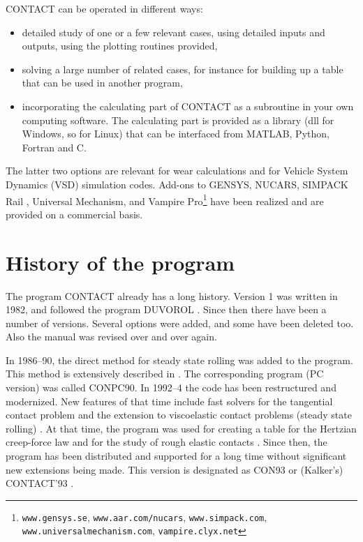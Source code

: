 \documentclass[12pt]{report}
\begin{document}
CONTACT can be operated in different ways:
\begin{itemize}
\item detailed study of one or a few relevant cases, using detailed inputs
        and outputs, using the plotting routines provided,
\item solving a large number of related cases, for instance for building up
        a table that can be used in another program,
\item incorporating the calculating part of CONTACT as a subroutine in your
        own computing software. The calculating part is provided as a
        library (dll for Windows, so for Linux) that can be interfaced from
        MATLAB, Python, Fortran and C.
\end{itemize}
The latter two options are relevant for wear calculations and for Vehicle
System Dynamics (VSD) simulation codes. Add-ons to GENSYS, NUCARS, SIMPACK
Rail \cite{Vollebregt2024b-railways,memo24004-simpack-usub}, 
Universal Mechanism, and Vampire Pro\footnote{{\tt www.gensys.se}, 
{\tt www.aar.com/nucars}, {\tt www.simpack.com}, 
{\tt www.universalmechanism.com}, {\tt vampire.\-clyx.net}} have been realized
and are provided on a commercial basis.

\section{History of the program}

The program CONTACT already has a long history. Version 1 was written in
1982, and followed the program DUVOROL \cite{Kalker1979a,Tsjoeng1980}. Since
then there have been a number of versions. Several options were added, and
some have been deleted too. Also the manual was revised over and over again.

In 1986--90, the direct method for steady state rolling was added to the
program. This method is extensively described in \cite{Kalker1990}. The
corresponding program (PC version) was called CONPC90. In 1992--4 the code
has been restructured and modernized.  New features of that time include
fast solvers for the tangential contact problem
\cite{Vollebregt1995a-convexgs} and the extension to viscoelastic contact
problems (steady state rolling)
\cite{Wang_guangqiu1992b,Wang_guangqiu1993}. At that time, the program was
used for creating a table for the Hertzian creep-force law
\cite{Kalker1996b-usetab} and for the study of rough elastic contacts
\cite{Kalker1997}. Since then, the program has been distributed and
supported for a long time without significant new extensions being made.
This version is designated as CON93 or (Kalker's) CONTACT'93
\cite{Vollebregt1993f-con93}.
\end{document}
